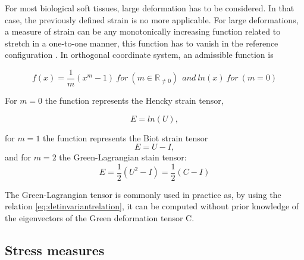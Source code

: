 For most biological soft tissues, large deformation has to be considered. In that case, the previously defined strain is no more applicable. For large deformations, a measure of strain can be any monotonically increasing function related to stretch in a one-to-one manner, this function has to vanish in the reference configuration \citep{mcmeeking_finite_1975}. In orthogonal coordinate system, an admissible function is  

\begin{equation}
f(x) = \frac{1}{m}(x^m-1) \ for \ (m \in \mathbb R _{\ne 0})\  \ and \ ln(x) \ for \ (m=0)
\end{equation}


For $m = 0$ the function represents the Hencky strain tensor, 

\begin{equation}
E = ln(U), 
\end{equation}

for $m=1$  the function represents the Biot strain tensor 
\begin{equation}
E = U-I,
\end{equation}
and for $m=2$ the Green-Lagrangian stain tensor:
\begin{equation}
E = \frac{1}{2}(U^2-I) =  \frac{1}{2}(C-I)
\end{equation}

The Green-Lagrangian tensor is commonly used in practice as, by using the relation \ref{eq:detinvariantrelation}, it can be computed without prior knowledge of the eigenvectors of the Green deformation tensor C.
%

\subsection{Stress measures}\label{subsection:stressmeasure}

